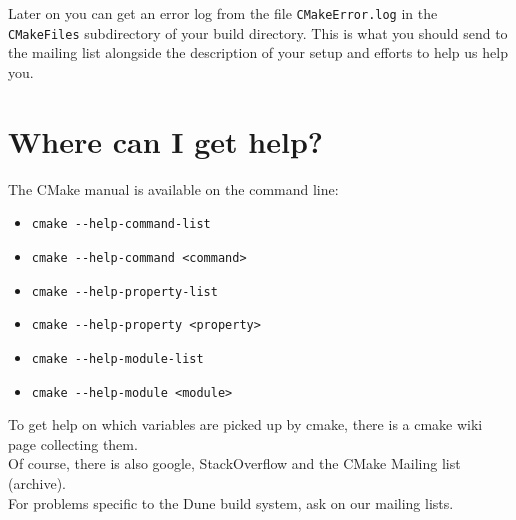 \documentclass[a4paper,10pt]{scrartcl}
\begin{document}
Later on you can get an error log from the file \lstinline!CMakeError.log! in the \lstinline!CMakeFiles! subdirectory of your build directory. This is what you should send to the mailing list alongside the description of your setup and efforts to help us help you.

\section{Where can I get help?}
\label{help}

The CMake manual is available on the command line:
 \begin{itemize}
  \item \verb!cmake --help-command-list!
  \item \verb!cmake --help-command <command>!
  \item \verb!cmake --help-property-list!
  \item \verb!cmake --help-property <property>!
  \item \verb!cmake --help-module-list!
  \item \verb!cmake --help-module <module>!
 \end{itemize}
  \vspace{.5 cm}
 To get help on which variables are picked up by cmake, there is a cmake wiki page collecting them. \\

 Of course, there is also google, StackOverflow and the CMake Mailing list (archive). \\

 For problems specific to the Dune build system, ask on our mailing lists.
\end{document}
